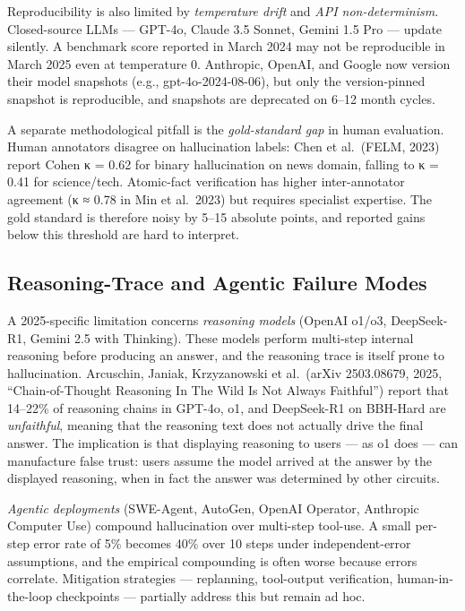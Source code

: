 Reproducibility is also limited by \emph{temperature drift} and \emph{API non-determinism}. Closed-source LLMs --- GPT-4o, Claude 3.5 Sonnet, Gemini 1.5 Pro --- update silently. A benchmark score reported in March 2024 may not be reproducible in March 2025 even at temperature 0. Anthropic, OpenAI, and Google now version their model snapshots (e.g., gpt-4o-2024-08-06), but only the version-pinned snapshot is reproducible, and snapshots are deprecated on 6--12 month cycles.

A separate methodological pitfall is the \emph{gold-standard gap} in human evaluation. Human annotators disagree on hallucination labels: Chen et al.~(FELM, 2023) report Cohen κ = 0.62 for binary hallucination on news domain, falling to κ = 0.41 for science/tech. Atomic-fact verification has higher inter-annotator agreement (κ ≈ 0.78 in Min et al.~2023) but requires specialist expertise. The gold standard is therefore noisy by 5--15 absolute points, and reported gains below this threshold are hard to interpret.

\subsection{Reasoning-Trace and Agentic Failure Modes}\label{reasoning-trace-and-agentic-failure-modes}

A 2025-specific limitation concerns \emph{reasoning models} (OpenAI o1/o3, DeepSeek-R1, Gemini 2.5 with Thinking). These models perform multi-step internal reasoning before producing an answer, and the reasoning trace is itself prone to hallucination. Arcuschin, Janiak, Krzyzanowski et al.~(arXiv 2503.08679, 2025, ``Chain-of-Thought Reasoning In The Wild Is Not Always Faithful'') report that 14--22\% of reasoning chains in GPT-4o, o1, and DeepSeek-R1 on BBH-Hard are \emph{unfaithful}, meaning that the reasoning text does not actually drive the final answer. The implication is that displaying reasoning to users --- as o1 does --- can manufacture false trust: users assume the model arrived at the answer by the displayed reasoning, when in fact the answer was determined by other circuits.

\emph{Agentic deployments} (SWE-Agent, AutoGen, OpenAI Operator, Anthropic Computer Use) compound hallucination over multi-step tool-use. A small per-step error rate of 5\% becomes 40\% over 10 steps under independent-error assumptions, and the empirical compounding is often worse because errors correlate. Mitigation strategies --- replanning, tool-output verification, human-in-the-loop checkpoints --- partially address this but remain ad hoc.


